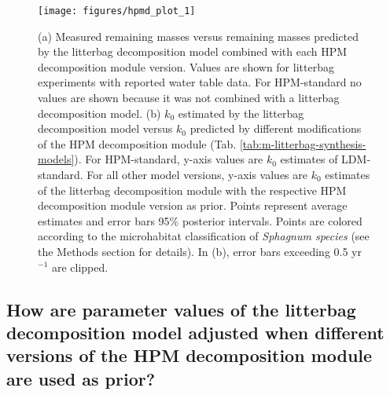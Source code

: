 \documentclass[esd, manuscript]{copernicus}
\begin{document}
\begin{figure}[H]

{\centering \texttt{[image: figures/hpmd\_plot\_1]} 

}

\caption{(a) Measured remaining masses versus remaining masses predicted by the litterbag decomposition model combined with each HPM decomposition module version. Values are shown for litterbag experiments with reported water table data. For HPM-standard no values are shown because it was not combined with a litterbag decomposition model. (b) \(k_0\) estimated by the litterbag decomposition model versus \(k_0\) predicted by different modifications of the HPM decomposition module (Tab. \ref{tab:m-litterbag-synthesis-models}). For HPM-standard, y-axis values are \(k_0\) estimates of LDM-standard. For all other model versions, y-axis values are \(k_0\) estimates of the litterbag decomposition module with the respective HPM decomposition module version as prior. Points represent average estimates and error bars 95\% posterior intervals. Points are colored according to the microhabitat classification of \emph{Sphagnum species} (see the Methods section for details). In (b), error bars exceeding 0.5 yr\(^{-1}\) are clipped.}\label{fig:out-p-hpm-mm27-2-mm29-1-mm30-1-p1}
\end{figure}

\subsection{How are parameter values of the litterbag decomposition model adjusted when different versions of the HPM decomposition module are used as prior?}
\end{document}
